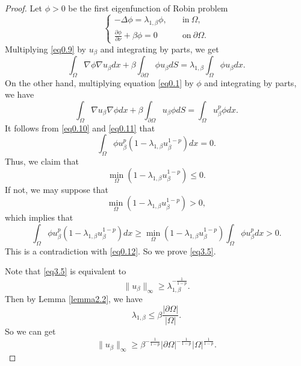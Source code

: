 \documentclass[12pt,reqno]{amsart}
\numberwithin{equation}{section}
\theoremstyle{definition}
\begin{document}
\begin{proof}
Let $\phi>0$ be the first eigenfunction of Robin problem 
\begin{equation}\label{eq0.9}
\begin{cases}
-\Delta \phi=\lambda_{1,\beta}\phi,\quad &\text{in}\ \Omega,\\
\frac{\partial \phi}{\partial\nu}+\beta\phi=0 &\text{on}\ \partial\Omega.
\end{cases}
\end{equation}
Multiplying \eqref{eq0.9} by $u_\beta$ and integrating by parts, we get 
\begin{equation}\label{eq0.10}
\int_{\Omega}\nabla \phi\nabla u_\beta dx+\beta\int_{\partial\Omega}\phi u_\beta dS=\lambda_{1,\beta}\int_{\Omega}\phi u_\beta dx.
\end{equation}
On the other hand, multiplying equation \eqref{eq0.1} by $\phi$ and integrating by parts, we have 
\begin{equation}\label{eq0.11}
\int_{\Omega}\nabla u_\beta\nabla \phi dx+\beta\int_{\partial\Omega} u_\beta\phi dS=\int_{\Omega}u_\beta^p\phi dx.
\end{equation}
It follows from \eqref{eq0.10} and \eqref{eq0.11} that 
\begin{equation}\label{eq0.12}
\int_{\Omega}\phi u_\beta^p(1-\lambda_{1,\beta}u_\beta^{1-p})dx=0.
\end{equation}
Thus, we claim that 
\begin{equation}\label{eq3.5}
\min_{\Omega}(1-\lambda_{1,\beta}u_\beta^{1-p})\leq 0.
\end{equation}
If not, we may suppose that 
\begin{equation*}
\min_{\Omega}(1-\lambda_{1,\beta}u_\beta^{1-p})> 0,
\end{equation*}
which implies that 
$$
\int_{\Omega}\phi u_\beta^p(1-\lambda_{1,\beta}u_\beta^{1-p})dx\ge \min_{\Omega}(1-\lambda_{1,\beta}u_\beta^{1-p})\int_{\Omega}\phi u_\beta^pdx>0.
$$
This is a contradiction with \eqref{eq0.12}. So we prove \eqref{eq3.5}.

Note that \eqref{eq3.5} is equivalent to 
$$
\|u_\beta\|_\infty\ge \lambda_{1,\beta}^{-\frac{1}{1-p}}.
$$
Then by Lemma \ref{lemma2.2}, we have 
$$
\lambda_{1,\beta}\leq \beta\frac{|\partial\Omega|}{|\Omega|}.
$$
So we can get 
$$
\|u_\beta\|_\infty\ge \beta^{-\frac{1}{1-p}}|\partial\Omega|^{-\frac{1}{1-p}}|\Omega|^{\frac{1}{1-p}}.
$$
\end{proof}
\end{document}
